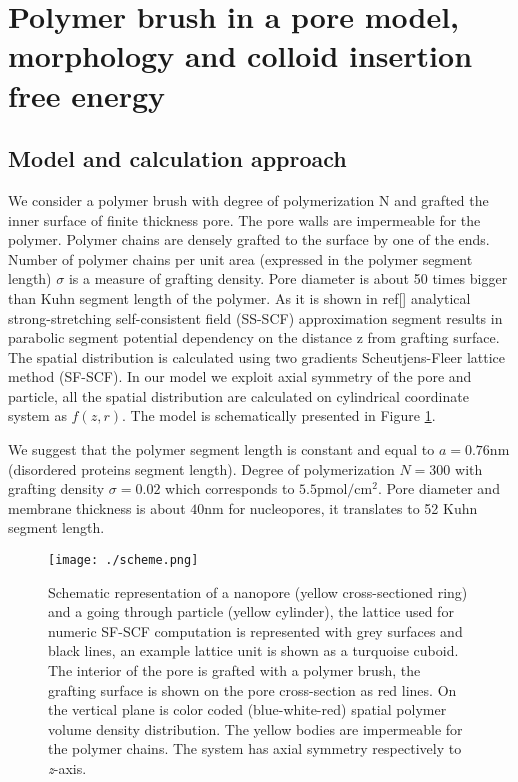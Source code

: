 \documentclass[12pt,a4paper]{article}
\begin{document}
\section{Polymer brush in a pore model, morphology and colloid insertion free energy}
\subsection{Model and calculation approach}
We consider a polymer brush with degree of polymerization N and grafted the inner surface of finite thickness pore. The pore walls are impermeable for the polymer. 
Polymer chains are densely grafted to the surface by one of the ends. 
Number of polymer chains per unit area (expressed in the polymer segment length) $\sigma$ is a measure of grafting density. 
Pore diameter is about 50 times bigger than Kuhn segment length of the polymer.
As it is shown in ref[] analytical strong-stretching self-consistent field (SS-SCF) approximation segment results in parabolic segment potential dependency on the distance z from grafting surface.
The spatial distribution is calculated using two gradients Scheutjens-Fleer lattice method (SF-SCF).
In our model we exploit axial symmetry of the pore and particle, all the spatial distribution are calculated on cylindrical coordinate system as $f(z, r)$.
The model is schematically presented in Figure \ref{fig: scheme3d}.

We suggest that the polymer segment length is constant and equal to $a = 0.76 \mbox{nm}$ (disordered proteins segment length). 
Degree of polymerization $N=300$ with grafting density $\sigma=0.02$ which corresponds to $5.5 \mbox{pmol}/\mbox{cm}^2$. 
Pore diameter and membrane thickness is about $40 \mbox{nm}$ for nucleopores, it translates to 52 Kuhn segment length.


\begin{figure}
    \texttt{[image: ./scheme.png]}
    \caption[]{Schematic representation of a nanopore (yellow cross-sectioned ring) and a going through particle (yellow cylinder), the lattice used for numeric SF-SCF computation is represented with grey surfaces and black lines, an example lattice unit is shown as a turquoise cuboid. 
    The interior of the pore is grafted with a polymer brush, the grafting surface is shown on the pore cross-section as red lines.
    On the vertical plane is color coded (blue-white-red) spatial polymer volume density distribution.
    The yellow bodies are impermeable for the polymer chains.
    The system has axial symmetry respectively to \emph{z}-axis.}
    \label{fig: scheme3d}
\end{figure}
\end{document}
